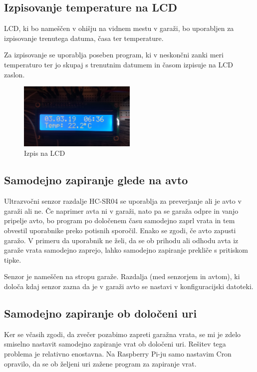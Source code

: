 \documentclass[11pt]{article}
\begin{document}
\subsection{Izpisovanje temperature na LCD}
LCD, ki bo nameščen v ohišju na vidnem mestu v garaži, bo uporabljen za izpisovanje trenutega datuma, časa ter temperature.

Za izpisovanje se uporablja poseben program, ki v neskončni zanki meri temperaturo ter jo skupaj s trenutnim datumem in časom izpisuje na LCD zaslon.

\begin{figure}[h]
\centering
\includegraphics[width=0.5\textwidth]{images/LCD_temp.jpg}
\caption{Izpis na LCD}
\end{figure}

\subsection{Samodejno zapiranje glede na avto}
Ultrazvočni senzor razdalje HC-SR04 se uporablja za preverjanje ali je avto v garaži ali ne. Če naprimer avta ni v garaži, nato pa se garaža odpre in vanjo pripelje avto, bo program po določenem času samodejno zaprl vrata in tem obvestil uporabnike preko potisnih sporočil. Enako se zgodi, če avto zapusti garažo. V primeru da uporabnik ne želi, da se ob prihodu ali odhodu avta iz garaže vrata samodejno zaprejo, lahko samodejno zapiranje prekliče s pritiskom tipke.

Senzor je nameščen na stropu garaže. Razdalja (med senzorjem in avtom), ki določa kdaj senzor zazna da je v garaži avto se nastavi v konfiguracijski datoteki.


\subsection{Samodejno zapiranje ob določeni uri}
Ker se včasih zgodi, da zvečer pozabimo zapreti garažna vrata, se mi je zdelo smiselno nastavit samodejno zapiranje vrat ob določeni uri. Rešitev tega problema je relativno enostavna. Na Raspberry Pi-ju samo nastavim Cron opravilo, da se ob željeni uri zažene program za zapiranje vrat.
\end{document}
